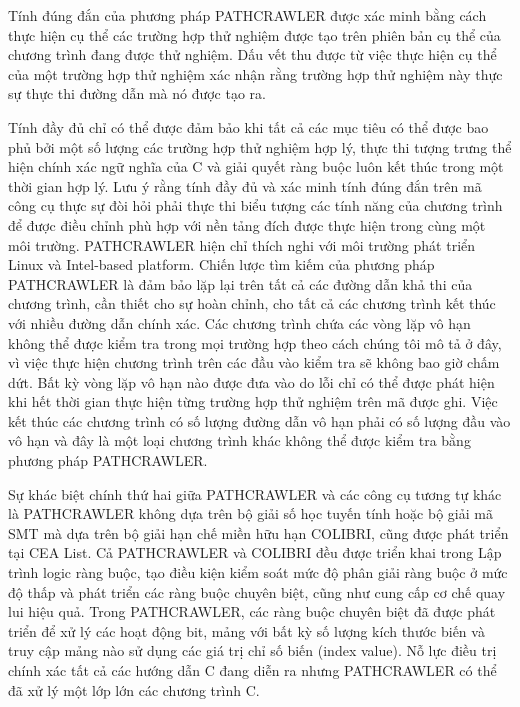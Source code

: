 \documentclass[12pt,a4paper]{article}
\begin{document}
\indent Tính đúng đắn của phương pháp PATHCRAWLER được xác minh bằng cách thực hiện cụ thể các trường hợp thử nghiệm được tạo trên phiên bản cụ thể của chương trình đang được thử nghiệm. Dấu vết thu được từ việc thực hiện cụ thể của một trường hợp thử nghiệm xác nhận rằng trường hợp thử nghiệm này thực sự thực thi đường dẫn mà nó được tạo ra.

\indent Tính đầy đủ chỉ có thể được đảm bảo khi tất cả các mục tiêu có thể được bao phủ bởi một số lượng các trường hợp thử nghiệm hợp lý, thực thi tượng trưng thể hiện chính xác ngữ nghĩa của C và giải quyết ràng buộc luôn kết thúc trong một thời gian hợp lý. Lưu ý rằng tính đầy đủ và xác minh tính đúng đắn trên mã công cụ thực sự đòi hỏi phải thực thi biểu tượng các tính năng của chương trình để được điều chỉnh phù hợp với nền tảng đích được thực hiện trong cùng một môi trường. PATHCRAWLER hiện chỉ thích nghi với môi trường phát triển Linux và Intel-based platform. Chiến lược tìm kiếm của phương pháp PATHCRAWLER là đảm bảo lặp lại trên tất cả các đường dẫn khả thi của chương trình, cần thiết cho sự hoàn chỉnh, cho tất cả các chương trình kết thúc với nhiều đường dẫn chính xác. Các chương trình chứa các vòng lặp vô hạn không thể được kiểm tra trong mọi trường hợp theo cách chúng tôi mô tả ở đây, vì việc thực hiện chương trình trên các đầu vào kiểm tra sẽ không bao giờ chấm dứt. Bất kỳ vòng lặp vô hạn nào được đưa vào do lỗi chỉ có thể được phát hiện khi hết thời gian thực hiện từng trường hợp thử nghiệm trên mã được ghi. Việc kết thúc các chương trình có số lượng đường dẫn vô hạn phải có số lượng đầu vào vô hạn và đây là một loại chương trình khác không thể được kiểm tra bằng phương pháp PATHCRAWLER.

\indent Sự khác biệt chính thứ hai giữa PATHCRAWLER và các công cụ tương tự khác là PATHCRAWLER không dựa trên bộ giải số học tuyến tính hoặc bộ giải mã SMT mà dựa trên bộ giải hạn chế miền hữu hạn COLIBRI, cũng được phát triển tại CEA List. Cả PATHCRAWLER và COLIBRI đều được triển khai trong Lập trình logic ràng buộc, tạo điều kiện kiểm soát mức độ phân giải ràng buộc ở mức độ thấp và phát triển các ràng buộc chuyên biệt, cũng như cung cấp cơ chế quay lui hiệu quả.  Trong PATHCRAWLER, các ràng buộc chuyên biệt đã được phát triển để xử lý các hoạt động bit, mảng với bất kỳ số lượng kích thước biến và truy cập mảng nào sử dụng các giá trị chỉ số biến (index value). Nỗ lực điều trị chính xác tất cả các hướng dẫn C đang diễn ra nhưng PATHCRAWLER có thể đã xử lý một lớp lớn các chương trình C.
\end{document}

